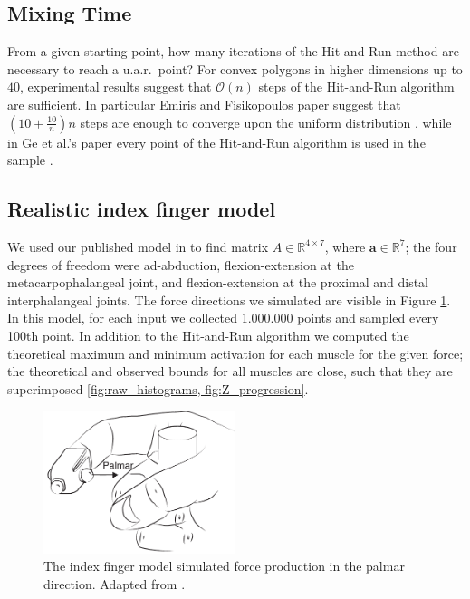 \subsection{Mixing Time}
\label{sec_lengthrun}
From a given starting point, how many iterations of the Hit-and-Run method are necessary to reach a u.a.r.\ point? For convex polygons in higher dimensions up to $40$, experimental results suggest that $\mathcal{O}(n)$ steps of the Hit-and-Run algorithm are sufficient.
In particular Emiris and Fisikopoulos paper suggest that $(10 + \frac{10}{n})n$ steps are enough to converge upon the uniform distribution \cite{emiris2013efficient}, while in Ge et al.'s paper every point of the Hit-and-Run algorithm is used in the sample \cite{Ge}. 


\subsection{Realistic index finger model}
\label{ss:finger}
We used our published model in \cite{Valero-Cuevas1998Large} to find matrix $A \in \mathbb{R}^{4 \times 7}$, where $\textbf{a} \in \mathbb{R}^7$; the four degrees of freedom were ad-abduction, flexion-extension at the metacarpophalangeal joint, and flexion-extension at the proximal and distal interphalangeal joints.
The force directions we simulated are visible in Figure \ref{fig:finger}.
In this model, for each input we collected 1.000.000 points and sampled every 100th point.
In addition to the Hit-and-Run algorithm we computed the theoretical maximum and minimum activation for each muscle for the given force; the theoretical and observed bounds for all muscles are close, such that they are superimposed \ref{fig:raw_histograms, fig:Z_progression}.

\begin{figure}[htbp]
  \centering
  \includegraphics[width=0.5\textwidth]{sections/figs/finger.pdf}
  \caption{The index finger model simulated force production in the palmar direction. Adapted from \cite{Valero-Cuevas1998Large}.}
  \label{fig:finger}
\end{figure}

